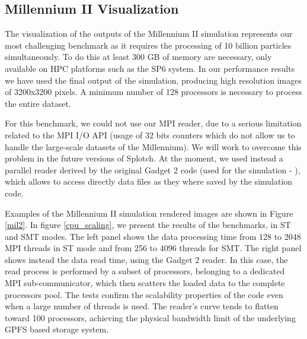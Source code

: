 
\subsection{Millennium II Visualization}
\label{mII}

The visualization of the outputs of the Millennium II simulation \cite{2009MNRAS.398.1150B} 
represents our most challenging benchmark as it requires the processing of 10 billion particles 
simultaneously. To do this at least 300 GB of memory are necessary, only available 
on HPC platforms such as the SP6 system.
In our performance results we have used the final output of the simulation, producing 
high resolution images of 3200x3200 pixels. A minimum number of 128 processors 
is necessary to process the entire dataset.

For this benchmark, we could not use our MPI reader, due to a serious limitation related 
to the MPI I/O API (usage of 32 bits counters which do not allow us to handle the large-scale datasets of the Millennium).
We will work to overcome this problem in the future versions of Splotch. 
At the moment, we used instead a parallel reader derived by the original Gadget 2 code 
(used for the simulation - \cite{gadget}), 
which allows to access directly data files as they where saved by the simulation code. 

Examples of the Millennium II simulation rendered images are shown in Figure \ref{mil2}.
In figure \ref{cpu_scaling}, we present the results of the benchmarks, in ST and SMT modes.
The left panel shows the data processing time from 128 to 2048 MPI threads in ST mode and from
256 to 4096 threads for SMT. The right panel shows instead the data read time, using 
the Gadget 2 reader. In this case, the read process is performed by a subset of processors,
belonging to a dedicated MPI sub-communicator, which then scatters the loaded data to the complete
processors pool. The tests confirm the scalability properties of the code even when a large number
of threads is used. The reader's curve tends to flatten toward 100 processors, achieving 
the physical bandwidth limit of the underlying GPFS based storage system. 

